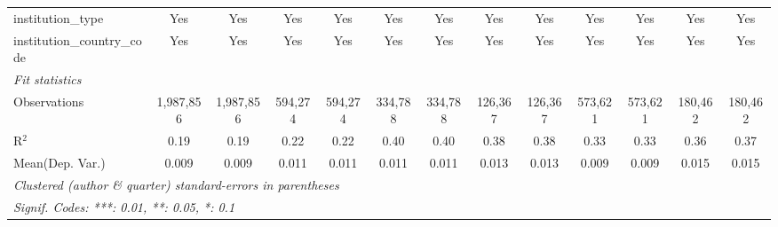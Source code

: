 \begin{tabular}{lcccccccccccc}
   institution\_type                        & Yes            & Yes             & Yes            & Yes             & Yes           & Yes             & Yes     & Yes            & Yes            & Yes            & Yes            & Yes\\  
   institution\_country\_code               & Yes            & Yes             & Yes            & Yes             & Yes           & Yes             & Yes     & Yes            & Yes            & Yes            & Yes            & Yes\\  
   \midrule
   \emph{Fit statistics}\\
   Observations                             & 1,987,856      & 1,987,856       & 594,274        & 594,274         & 334,788       & 334,788         & 126,367 & 126,367        & 573,621        & 573,621        & 180,462        & 180,462\\  
   R$^2$                                    & 0.19           & 0.19            & 0.22           & 0.22            & 0.40          & 0.40            & 0.38    & 0.38           & 0.33           & 0.33           & 0.36           & 0.37\\  
Mean(Dep. Var.) & 0.009 & 0.009 & 0.011 & 0.011 & 0.011 & 0.011 & 0.013 & 0.013 & 0.009 & 0.009 & 0.015 & 0.015 \\
   \midrule \midrule
   \multicolumn{13}{l}{\emph{Clustered (author \& quarter) standard-errors in parentheses}}\\
   \multicolumn{13}{l}{\emph{Signif. Codes: ***: 0.01, **: 0.05, *: 0.1}}\\
\end{tabular}
\par\endgroup
